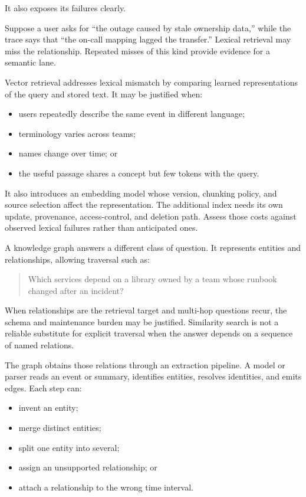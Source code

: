 It also exposes its failures clearly.

Suppose a user asks for ``the outage caused by stale ownership data,'' while the trace says that ``the on-call mapping lagged the transfer.'' Lexical retrieval may miss the relationship. Repeated misses of this kind provide evidence for a semantic lane.


Vector retrieval addresses lexical mismatch by comparing learned representations of the query and stored text. It may be justified when:

\begin{itemize}
\tightlist
\item
  users repeatedly describe the same event in different language;
\item
  terminology varies across teams;
\item
  names change over time; or
\item
  the useful passage shares a concept but few tokens with the query.
\end{itemize}

It also introduces an embedding model whose version, chunking policy, and source selection affect the representation. The additional index needs its own update, provenance, access-control, and deletion path. Assess those costs against observed lexical failures rather than anticipated ones.

A knowledge graph answers a different class of question. It represents entities and relationships, allowing traversal such as:

\begin{quote}
Which services depend on a library owned by a team whose runbook changed after an incident?
\end{quote}

When relationships are the retrieval target and multi-hop questions recur, the schema and maintenance burden may be justified. Similarity search is not a reliable substitute for explicit traversal when the answer depends on a sequence of named relations.


The graph obtains those relations through an extraction pipeline. A model or parser reads an event or summary, identifies entities, resolves identities, and emits edges. Each step can:

\begin{itemize}
\tightlist
\item
  invent an entity;
\item
  merge distinct entities;
\item
  split one entity into several;
\item
  assign an unsupported relationship; or
\item
  attach a relationship to the wrong time interval.
\end{itemize}

